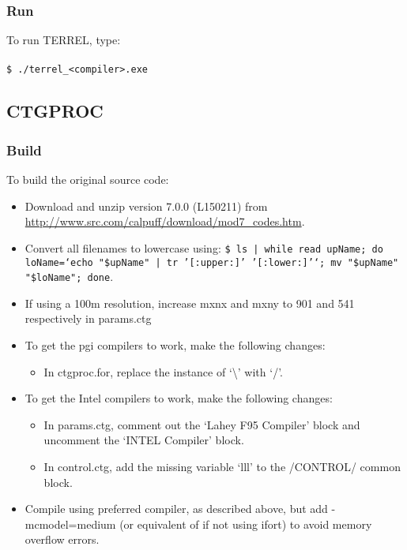 \documentclass[10pt,a4paper]{article}
\newcommand\tab[1][0.5cm]{\hspace*{#1}}
\begin{document}
\subsubsection{Run}
To run TERREL, type:\\\\
\tab \texttt{\$ ./terrel\_<compiler>.exe}

\subsection{CTGPROC}
\subsubsection{Build}
To build the original source code:
\begin{itemize}
\item Download and unzip version 7.0.0 (L150211) from \url{http://www.src.com/calpuff/download/mod7_codes.htm}.
\item Convert all filenames to lowercase using: \texttt{\$ ls | while read upName; do loName=`echo "\${upName}" | tr '[:upper:]' '[:lower:]'`; mv "\$upName" "\$loName"; done}.
\item If using a 100m resolution, increase mxnx and mxny to 901 and 541 respectively in params.ctg
\item To get the pgi compilers to work, make the following changes:
\begin{itemize}
\item In ctgproc.for, replace the instance of `\textbackslash' with `/'.
\end{itemize}
\item To get the Intel compilers to work, make the following changes:
\begin{itemize}
\item In params.ctg, comment out the `Lahey F95 Compiler' block and uncomment the `INTEL Compiler' block.
\item In control.ctg, add the missing variable `lll' to the /CONTROL/ common block.
\end{itemize}
\item Compile using preferred compiler, as described above, but add -mcmodel=medium (or equivalent of if not using ifort) to avoid memory overflow errors.
\end{itemize}
\end{document}
